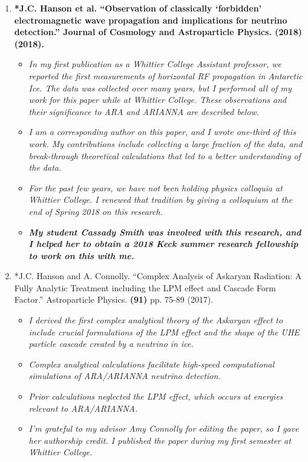 \documentclass[../../main.tex]{subfiles}
\begin{document}
\begin{enumerate}
\item \textbf{*J.C. Hanson et al. ``Observation of classically ‘forbidden’ electromagnetic wave propagation and implications for neutrino detection.'' Journal of Cosmology and Astroparticle Physics. \textbf{(2018)} (2018).}
\begin{itemize}
\item \textit{In my first publication as a Whittier College Assistant professor, we reported the first measurements of horizontal RF propagation in Antarctic Ice.  The data was collected over many years, but I performed all of my work for this paper while at Whittier College.  These observations and their significance to ARA and ARIANNA are described below.}
\item \textit{I am a corresponding author on this paper, and I wrote one-third of this work.  My contributions include collecting a large fraction of the data, and break-through theoretical calculations that led to a better understanding of the data.}
\item \textit{For the past few years, we have not been holding physics colloquia at Whittier College.  I renewed that tradition by giving a colloquium at the end of Spring 2018 on this research.}
\item \textit{\textbf{My student Cassady Smith was involved with this research, and I helped her to obtain a 2018 Keck summer research fellowship to work on this with me.}}
\end{itemize}
\item *J.C. Hanson and A. Connolly. ``Complex Analysis of Askaryan Radiation: A Fully Analytic Treatment including the LPM effect and Cascade Form Factor.'' Astroparticle Physics. \textbf{(91)} pp. 75-89 (2017).
\begin{itemize}
\item \textit{I derived the first complex analytical theory of the Askaryan effect to include crucial formulations of the LPM effect and the shape of the UHE particle cascade created by a neutrino in ice.}
\item \textit{Complex analytical calculations facilitate high-speed computational simulations of ARA/ARIANNA neutrino detection.}
\item \textit{Prior calculations neglected the LPM effect, which occurs at energies relevant to ARA/ARIANNA.}
\item \textit{I'm grateful to my advisor Amy Connolly for editing the paper, so I gave her authorship credit.  I published the paper during my first semester at Whittier College.}

\end{itemize}
\end{enumerate}
\end{document}
